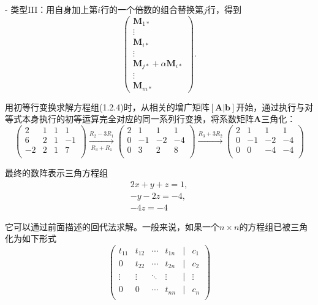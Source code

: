 - 类型III：用自身加上第\( i \)行的一个倍数的组合替换第\( j \)行，得到
\[
\begin{pmatrix}
	\mathbf{M}_{1*} \\
	\vdots \\
	\mathbf{M}_{i*} \\
	\vdots \\
	\mathbf{M}_{j*} + \alpha\mathbf{M}_{i*} \\
	\vdots \\
	\mathbf{M}_{m*}
\end{pmatrix}.
\tag{1.2.9}
\]

用初等行变换求解方程组(1.2.4)时，从相关的增广矩阵\( [\mathbf{A}|\mathbf{b}] \)开始，通过执行与对等式本身执行的初等运算完全对应的同一系列行变换，将系数矩阵\( \mathbf{A} \)三角化：
\[
\left(
\begin{array}{ccc|c}
	\boxed{2} & 1 & 1 & 1 \\
	6 & 2 & 1 & -1 \\
	-2 & 2 & 1 & 7 \\
\end{array}
\right)
\xrightarrow[R_3 + R_1]{R_2 - 3R_1}
\left(
\begin{array}{ccc|c}
	2 & 1 & 1 & 1 \\
	0 & \boxed{-1} & -2 & -4 \\
	0 & 3 & 2 & 8 \\
\end{array}
\right)
\xrightarrow{R_3 + 3R_2}
\left(
\begin{array}{ccc|c}
	2 & 1 & 1 & 1 \\
	0 & -1 & -2 & -4 \\
	0 & 0 & -4 & -4 \\
\end{array}
\right)
\]

最终的数阵表示三角方程组
\[\begin{aligned}2x+y+z=1,\\-y-2z=-4,\\-4z=-4\end{aligned}\]

它可以通过前面描述的回代法求解。一般来说，如果一个\( n \times n \)的方程组已被三角化为如下形式
\[
\begin{pmatrix}
	t_{11} & t_{12} & \cdots & t_{1n} & \big| & c_1 \\
	0 & t_{22} & \cdots & t_{2n} & \big| & c_2 \\
	\vdots & \vdots & \ddots & \vdots & \big| & \vdots \\
	0 & 0 & \cdots & t_{nn} & \big| & c_n \\
\end{pmatrix}
\tag{1.2.10}
\]

